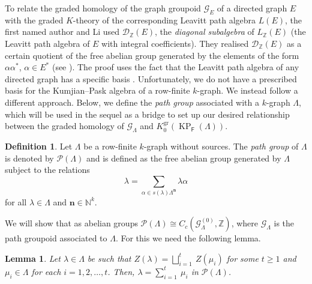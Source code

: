 \documentclass[12pt]{amsart}
\newcommand{\N}{\mathbf{n}}
\newcommand{\KP}{\operatorname{KP}}
\newtheorem{lem}[thm]{Lemma}
\theoremstyle{definition}
\newtheorem{dfn}[thm]{Definition}
\theoremstyle{remark}
\newcommand{\gr}{\operatorname{gr}}
\begin{document}
To relate the graded homology of the graph groupoid $\mathcal{G}_E$ of a directed graph $E$ with the graded $K$-theory of the corresponding Leavitt path algebra $L(E)$, the first named author and Li used $\mathcal{D}_\mathbb{Z}(E)$, the \emph{diagonal subalgebra} of $L_\mathbb{Z}(E)$ (the Leavitt path algebra of $E$ with integral coefficients). They realised $\mathcal{D}_\mathbb{Z}(E)$ as a certain quotient of the free abelian group generated by the elements of the form $\alpha\alpha^*$, $\alpha\in E^*$ (see \cite[Lemma 6.4]{H-Li}). The proof uses the fact that the Leavitt path algebra of any directed graph has a specific basis \cite[Lemma 6.2]{H-Li}. Unfortunately, we do not have a prescribed basis for the Kumjian--Pask algebra of a row-finite $k$-graph. We instead follow a different approach. Below, we define the \emph{path group} associated with a $k$-graph $\Lambda$, which will be used in the sequel as a bridge to set up our desired relationship between the graded homology of $\mathcal{G}_\Lambda$ and $K_0^{\gr}(\KP_\mathsf{F}(\Lambda))$.   
\begin{dfn}\label{def path group}
Let $\Lambda$ be a row-finite $k$-graph without sources. The \emph{path group} of $\Lambda$ is denoted by $\mathcal{P}(\Lambda)$ and is defined as the free abelian group generated by $\Lambda$ subject to the relations
\begin{equation}\label{pathrel}
\lambda=\displaystyle{\sum_{\alpha\in s(\lambda)\Lambda^\N}} \lambda\alpha    
\end{equation}
for all $\lambda\in \Lambda$ and $\N\in \mathbb{N}^k$.
\end{dfn}
We will show that as abelian groups $\mathcal{P}(\Lambda)\cong C_c(\mathcal{G}_\Lambda^{(0)},\mathbb{Z})$, where $\mathcal{G}_\Lambda$ is the path groupoid associated to $\Lambda$. For this we need the following lemma.
\begin{lem}\label{lem key for showing well-definedness}
Let $\lambda\in \Lambda$ be such that $Z(\lambda)=\displaystyle{\bigsqcup_{i=1}^{t}}~Z(\mu_i)$ for some $t\ge 1$ and $\mu_i\in \Lambda$ for each $i=1,2,\ldots,t$. Then, $\lambda=\displaystyle{\sum_{i=1}^{t}} ~\mu_i$ in $\mathcal{P}(\Lambda)$.     
\end{lem}
\end{document}
